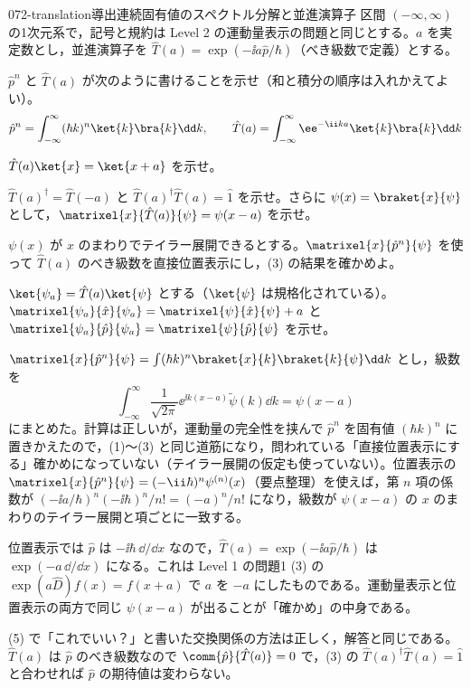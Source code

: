 \documentclass[uplatex,dvipdfmx,a4paper,11pt]{jsarticle}
\begin{document}
\mondaihen
{}
\begin{mondai}{072-translation}{導出}{連続固有値のスペクトル分解と並進演算子}
区間 $(-\infty,\infty)$ の1次元系で，記号と規約は Level 2 の運動量表示の問題と同じとする。$a$ を実定数とし，並進演算子を $\hat{T}(a)=\exp(-\ii a\hat{p}/\hbar)$（べき級数で定義）とする。
  \begin{shoumon}
    \item $\hat{p}^{n}$ と $\hat{T}(a)$ が次のように書けることを示せ（和と積分の順序は入れかえてよい）。
    \[ \hat{p}^{n}=\int_{-\infty}^{\infty}(\hbar k)^{n}\ket{k}\bra{k}\dd k,\qquad \hat{T}(a)=\int_{-\infty}^{\infty}\ee^{-\ii ka}\ket{k}\bra{k}\dd k \]
    \item $\hat{T}(a)\ket{x}=\ket{x+a}$ を示せ。
    \item $\hat{T}(a)^{\dagger}=\hat{T}(-a)$ と $\hat{T}(a)^{\dagger}\hat{T}(a)=\hat{1}$ を示せ。さらに $\psi(x)=\braket{x}{\psi}$ として，$\matrixel{x}{\hat{T}(a)}{\psi}=\psi(x-a)$ を示せ。
    \item $\psi(x)$ が $x$ のまわりでテイラー展開できるとする。$\matrixel{x}{\hat{p}^{n}}{\psi}$ を使って $\hat{T}(a)$ のべき級数を直接位置表示にし，(3) の結果を確かめよ。
    \item $\ket{\psi_{a}}=\hat{T}(a)\ket{\psi}$ とする（$\ket{\psi}$ は規格化されている）。$\matrixel{\psi_{a}}{\hat{x}}{\psi_{a}}=\matrixel{\psi}{\hat{x}}{\psi}+a$ と $\matrixel{\psi_{a}}{\hat{p}}{\psi_{a}}=\matrixel{\psi}{\hat{p}}{\psi}$ を示せ。
  \end{shoumon}

\begin{kotaeran}
   $\matrixel{x}{\hat{p}^{n}}{\psi}=\int(\hbar k)^{n}\braket{x}{k}\braket{k}{\psi}\dd k$ とし，級数を
  \[ \int_{-\infty}^{\infty}\frac{1}{\sqrt{2\pi}}\ee^{\ii k(x-a)}\tilde{\psi}(k)\dd k=\psi(x-a) \]
  にまとめた。計算は正しいが，運動量の完全性を挟んで $\hat{p}^{n}$ を固有値 $(\hbar k)^{n}$ に置きかえたので，(1)〜(3) と同じ道筋になり，問われている「直接位置表示にする」確かめになっていない（テイラー展開の仮定も使っていない）。位置表示の $\matrixel{x}{\hat{p}^{n}}{\psi}=(-\ii\hbar)^{n}\psi^{(n)}(x)$（要点整理）を使えば，第 $n$ 項の係数が $(-\ii a/\hbar)^{n}(-\ii\hbar)^{n}/n!=(-a)^{n}/n!$ になり，級数が $\psi(x-a)$ の $x$ のまわりのテイラー展開と項ごとに一致する。
\end{kotaeran}
\begin{rikai}
  \item 位置表示では $\hat{p}$ は $-\ii\hbar\,\dd/\dd x$ なので，$\hat{T}(a)=\exp(-\ii a\hat{p}/\hbar)$ は $\exp(-a\,\dd/\dd x)$ になる。これは Level 1 の問題1 (3) の $\exp(a\hat{D})f(x)=f(x+a)$ で $a$ を $-a$ にしたものである。運動量表示と位置表示の両方で同じ $\psi(x-a)$ が出ることが「確かめ」の中身である。
  \item (5) で「これでいい？」と書いた交換関係の方法は正しく，解答と同じである。$\hat{T}(a)$ は $\hat{p}$ のべき級数なので $\comm{\hat{p}}{\hat{T}(a)}=0$ で，(3) の $\hat{T}(a)^{\dagger}\hat{T}(a)=\hat{1}$ と合わせれば $\hat{p}$ の期待値は変わらない。
\end{rikai}
\end{mondai}
\end{document}

